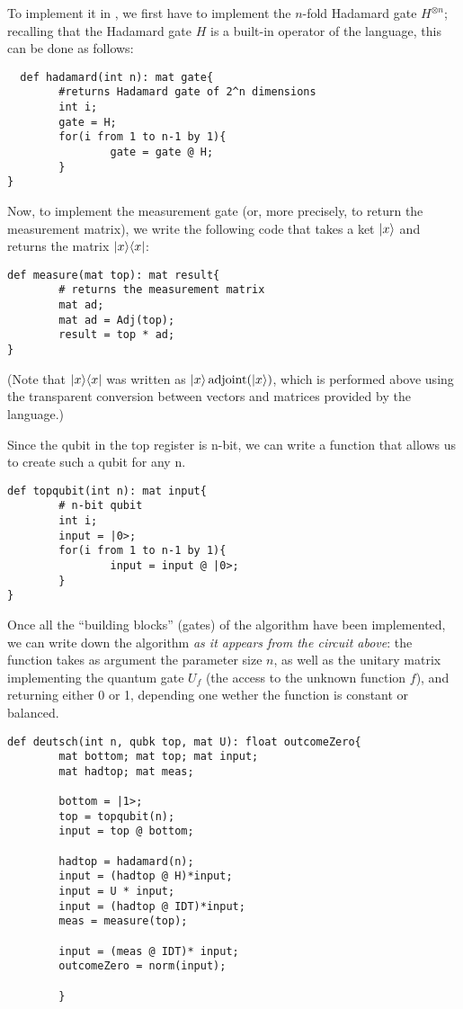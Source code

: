 To implement it in \QL, we first have to implement the $n$-fold Hadamard gate $H^{\otimes n}$; recalling that the Hadamard gate $H$ is a built-in operator of the language, this can be done as follows:
\begin{lstlisting}
  def hadamard(int n): mat gate{
        #returns Hadamard gate of 2^n dimensions
        int i;
        gate = H; 
        for(i from 1 to n-1 by 1){
                gate = gate @ H;                 
        }       
}
\end{lstlisting}
Now, to implement the measurement gate (or, more precisely, to return the measurement matrix), we write the following code that takes a ket $|x\rangle$ and returns the matrix $|x\rangle\langle x|$:
\begin{lstlisting}
def measure(mat top): mat result{
        # returns the measurement matrix  
        mat ad;
        mat ad = Adj(top);
        result = top * ad;
}
\end{lstlisting}
(Note that $|x\rangle\langle x|$ was written as $|x\rangle\operatorname{adjoint}(|x\rangle)$, which is performed above using the transparent conversion between vectors and matrices provided by the language.)\medskip

Since the qubit in the top register is n-bit, we can write a function that allows us to create such a qubit for any n.

\begin{lstlisting}
def topqubit(int n): mat input{
        # n-bit qubit
        int i;
        input = |0>;
        for(i from 1 to n-1 by 1){
                input = input @ |0>;                 
        }    
}
\end{lstlisting}

Once all the ``building blocks'' (gates) of the algorithm have been implemented, we can write down the algorithm \emph{as it appears from the circuit above}: the function takes as argument the parameter size $n$, as well as the unitary matrix implementing the quantum  gate $U_f$ (the access to the unknown function $f$), and returning either 0 or 1, depending one wether the function is constant or balanced.
\begin{lstlisting}
def deutsch(int n, qubk top, mat U): float outcomeZero{ 
        mat bottom; mat top; mat input;
        mat hadtop; mat meas;

        bottom = |1>;
        top = topqubit(n);
        input = top @ bottom;
        
        hadtop = hadamard(n);
        input = (hadtop @ H)*input;
        input = U * input;
        input = (hadtop @ IDT)*input;
        meas = measure(top);

        input = (meas @ IDT)* input;
        outcomeZero = norm(input);

        }
\end{lstlisting}

